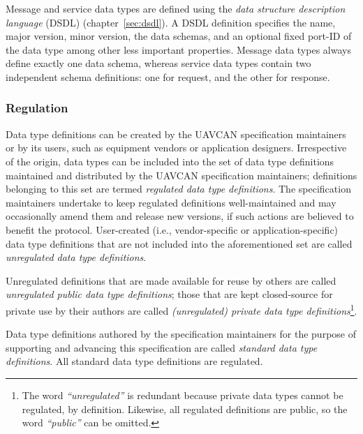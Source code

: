 Message and service data types
are defined using the \emph{data structure description language} (DSDL) (chapter~\ref{sec:dsdl}).
A DSDL definition specifies the name, major version, minor version, the data schemas,
and an optional fixed port-ID of the data type among other less important properties.
Message data types always define exactly one data schema, whereas
service data types contain two independent schema definitions: one for request, and the other for response.

\subsubsection{Regulation}\label{sec:basic_data_type_regulation}

Data type definitions can be created by the UAVCAN specification maintainers or by its users,
such as equipment vendors or application designers.
Irrespective of the origin, data types can be included into the set of data type definitions maintained
and distributed by the UAVCAN specification maintainers;
definitions belonging to this set are termed \emph{regulated data type definitions}.
The specification maintainers undertake to keep regulated definitions well-maintained and may occasionally
amend them and release new versions, if such actions are believed to benefit the protocol.
User-created (i.e., vendor-specific or application-specific) data type definitions that are
not included into the aforementioned set are called \emph{unregulated data type definitions}.

Unregulated definitions that are made available for reuse by others are called
\emph{unregulated public data type definitions};
those that are kept closed-source for private use by their authors are called
\emph{(unregulated) private data type definitions}\footnote{The word \emph{``unregulated''} is redundant
because private data types cannot be regulated, by definition.
Likewise, all regulated definitions are public, so the word \emph{``public''} can be omitted.}.

Data type definitions authored by the specification maintainers for the purpose of supporting and advancing
this specification are called \emph{standard data type definitions}.
All standard data type definitions are regulated.

